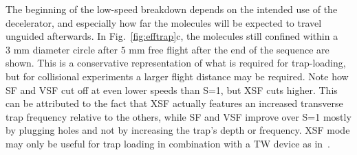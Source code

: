 \documentclass[%
 reprint,
 amsmath,amssymb,
 aps,
prl,
]{revtex4-1}
\begin{document}
The beginning of the low-speed breakdown depends on the intended use of the decelerator, and especially how far the molecules will be expected to travel unguided afterwards. 
In Fig.~\ref{fig:efftrap}c, the molecules still confined within a $3\text{ mm}$ diameter circle after $5\text{ mm}$ free flight after the end of the sequence are shown. 
This is a conservative representation of what is required for trap-loading, but for collisional experiments a larger flight distance may be required.
Note how SF and VSF cut off at even lower speeds than S=1, but XSF cuts higher. 
This can be attributed to the fact that XSF actually features an increased transverse trap frequency relative to the others, while SF and VSF improve over S=1 mostly by plugging holes and not by increasing the trap's depth or frequency.
XSF mode may only be useful for trap loading in combination with a TW device as in~\cite{Quintero-Perez2013}.
\end{document}
